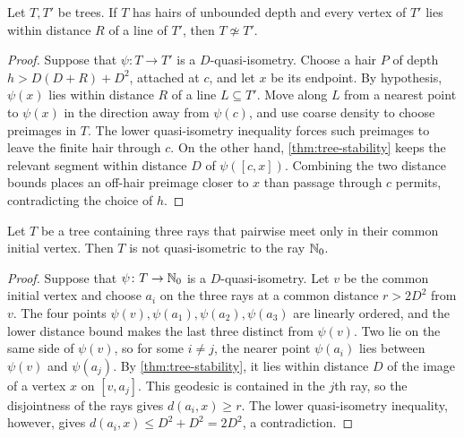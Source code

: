 \begin{proposition}
\label{thm:hair-separation}
\leanok
Let $T,T'$ be trees. If $T$ has hairs of unbounded depth and every vertex of $T'$ lies within
distance $R$ of a line of $T'$, then $T\not\simeq T'$.
\end{proposition}

\begin{proof}
\leanok
{}
Suppose that $\psi\colon T\to T'$ is a $D$-quasi-isometry. Choose a hair $P$ of depth
$h>D(D+R)+D^2$, attached at $c$, and let $x$ be its endpoint. By hypothesis, $\psi(x)$ lies
within distance $R$ of a line $L\subseteq T'$. Move along $L$ from a nearest point to
$\psi(x)$ in the direction away from $\psi(c)$, and use coarse density to choose preimages in
$T$. The lower quasi-isometry inequality forces such preimages to leave the finite hair through
$c$. On the other hand, \cref{thm:tree-stability} keeps the relevant segment within distance
$D$ of $\psi([c,x])$. Combining the two distance bounds places an off-hair preimage closer to
$x$ than passage through $c$ permits, contradicting the choice of $h$.
\end{proof}

\begin{proposition}
\label{thm:three-rays}
\leanok
Let $T$ be a tree containing three rays that pairwise meet only in their common initial vertex.
Then $T$ is not quasi-isometric to the ray $\mathbb{N}_0$.
\end{proposition}

\begin{proof}
\leanok
{}
Suppose that $\psi\colon T\to\mathbb{N}_0$ is a $D$-quasi-isometry. Let $v$ be the common initial
vertex and choose $a_i$ on the three rays at a common distance $r>2D^2$ from $v$. The four
points $\psi(v),\psi(a_1),\psi(a_2),\psi(a_3)$ are linearly ordered, and the lower distance
bound makes the last three distinct from $\psi(v)$. Two lie on the same side of $\psi(v)$, so
for some $i\neq j$, the nearer point $\psi(a_i)$ lies between $\psi(v)$ and $\psi(a_j)$. By
\cref{thm:tree-stability}, it lies within distance $D$ of the image of a vertex $x$ on
$[v,a_j]$. This geodesic is contained in the $j$th ray, so the disjointness of the rays gives
$d(a_i,x)\geq r$. The lower quasi-isometry inequality, however, gives
$d(a_i,x)\leq D^2+D^2=2D^2$, a contradiction.
\end{proof}

